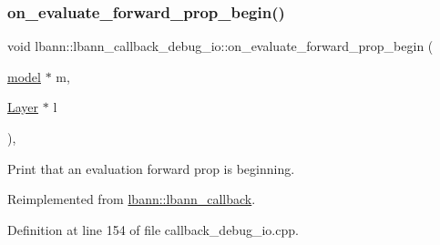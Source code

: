 \mbox{\label{classlbann_1_1lbann__callback__debug__io_ac9b36fc36ab6faa9de44db026addf02a}} 
\subsubsection{\texorpdfstring{on\+\_\+evaluate\+\_\+forward\+\_\+prop\+\_\+begin()}{on\_evaluate\_forward\_prop\_begin()}}
{\footnotesize\ttfamily void lbann\+::lbann\+\_\+callback\+\_\+debug\+\_\+io\+::on\+\_\+evaluate\+\_\+forward\+\_\+prop\+\_\+begin (\begin{DoxyParamCaption}\item[{\hyperlink{classlbann_1_1model}{model} $\ast$}]{m,  }\item[{\hyperlink{classlbann_1_1Layer}{Layer} $\ast$}]{l }\end{DoxyParamCaption})\hspace{0.3cm}{\ttfamily [override]}, {\ttfamily [virtual]}}

Print that an evaluation forward prop is beginning. 

Reimplemented from \hyperlink{classlbann_1_1lbann__callback_a044174864e4981a1dac093d58e8c4d6c}{lbann\+::lbann\+\_\+callback}.



Definition at line 154 of file callback\+\_\+debug\+\_\+io.\+cpp.


